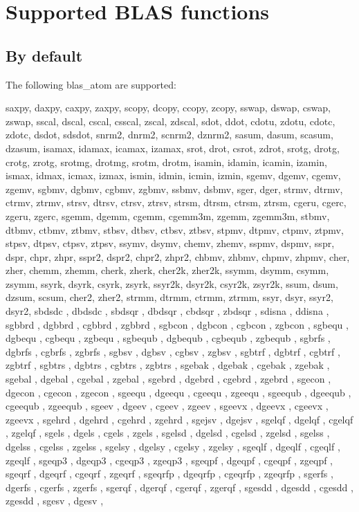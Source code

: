 \documentclass{article}
\begin{document}
\section{Supported BLAS functions}
\subsection{By default}
The following blas\_atom are supported:

saxpy,    daxpy,    caxpy,    zaxpy,    scopy,    dcopy,    ccopy,    zcopy,    sswap,    dswap,    cswap,    zswap,    sscal,    dscal,    cscal,    csscal,    zscal,    zdscal,    sdot,    ddot,    cdotu,    zdotu,    cdotc,    zdotc,    dsdot,    sdsdot,    snrm2,    dnrm2,    scnrm2,    dznrm2,    sasum,    dasum,    scasum,    dzasum,    isamax,    idamax,    icamax,    izamax,    srot,    drot,    csrot,    zdrot,    srotg,    drotg,    crotg,    zrotg,    srotmg,    drotmg,    srotm,    drotm,    isamin,    idamin,    icamin,    izamin,    ismax,    idmax,    icmax,    izmax,    ismin,    idmin,    icmin,    izmin,    sgemv,    dgemv,    cgemv,    zgemv,    sgbmv,    dgbmv,    cgbmv,    zgbmv,    ssbmv,    dsbmv,    sger,    dger,    strmv,    dtrmv,    ctrmv,    ztrmv,    strsv,    dtrsv,    ctrsv,    ztrsv,    strsm,    dtrsm,    ctrsm,    ztrsm,    cgeru,    cgerc,    zgeru,    zgerc,    sgemm,    dgemm,    cgemm,    cgemm3m,    zgemm,    zgemm3m,    stbmv,    dtbmv,    ctbmv,    ztbmv,    stbsv,    dtbsv,    ctbsv,    ztbsv,    stpmv,    dtpmv,    ctpmv,    ztpmv,    stpsv,    dtpsv,    ctpsv,    ztpsv,    ssymv,    dsymv,    chemv,    zhemv,    sspmv,    dspmv,    sspr,    dspr,    chpr,    zhpr,    sspr2,    dspr2,    chpr2,    zhpr2,    chbmv,    zhbmv,    chpmv,    zhpmv,    cher,    zher,    chemm,    zhemm,    cherk,    zherk,    cher2k,    zher2k,    ssymm,    dsymm,    csymm,    zsymm,    ssyrk,    dsyrk,    csyrk,    zsyrk,    ssyr2k,    dsyr2k,    csyr2k,    zsyr2k,    ssum,    dsum,    dzsum,    scsum,    cher2,    zher2,    strmm,    dtrmm,    ctrmm,    ztrmm,    ssyr,    dsyr,    ssyr2,    dsyr2, sbdsdc , dbdsdc , sbdsqr , dbdsqr , cbdsqr , zbdsqr , sdisna , ddisna , sgbbrd , dgbbrd , cgbbrd , zgbbrd , sgbcon , dgbcon , cgbcon , zgbcon , sgbequ , dgbequ , cgbequ , zgbequ , sgbequb , dgbequb , cgbequb , zgbequb , sgbrfs , dgbrfs , cgbrfs , zgbrfs , sgbsv , dgbsv , cgbsv , zgbsv , sgbtrf , dgbtrf , cgbtrf , zgbtrf , sgbtrs , dgbtrs , cgbtrs , zgbtrs , sgebak , dgebak , cgebak , zgebak , sgebal , dgebal , cgebal , zgebal , sgebrd , dgebrd , cgebrd , zgebrd , sgecon , dgecon , cgecon , zgecon , sgeequ , dgeequ , cgeequ , zgeequ , sgeequb , dgeequb , cgeequb , zgeequb , sgeev , dgeev , cgeev , zgeev , sgeevx , dgeevx , cgeevx , zgeevx , sgehrd , dgehrd , cgehrd , zgehrd , sgejsv , dgejsv , sgelqf , dgelqf , cgelqf , zgelqf , sgels , dgels , cgels , zgels , sgelsd , dgelsd , cgelsd , zgelsd , sgelss , dgelss , cgelss , zgelss , sgelsy , dgelsy , cgelsy , zgelsy , sgeqlf , dgeqlf , cgeqlf , zgeqlf , sgeqp3 , dgeqp3 , cgeqp3 , zgeqp3 , sgeqpf , dgeqpf , cgeqpf , zgeqpf , sgeqrf , dgeqrf , cgeqrf , zgeqrf , sgeqrfp , dgeqrfp , cgeqrfp , zgeqrfp , sgerfs , dgerfs , cgerfs , zgerfs , sgerqf , dgerqf , cgerqf , zgerqf , sgesdd , dgesdd , cgesdd , zgesdd , sgesv , dgesv , 
\end{document}
